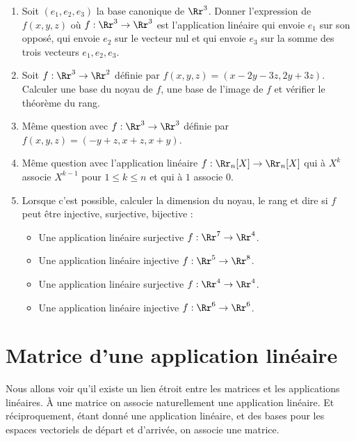 \documentclass[class=report,crop=false]{standalone}
\begin{document}
\begin{miniexercices}
\sauteligne
\begin{enumerate}
  \item Soit $(e_1,e_2,e_3)$ la base canonique de $\Rr^3$. Donner l'expression
  de $f(x,y,z)$ où $f : \Rr^3 \to \Rr^3$
  est l'application linéaire
  qui envoie $e_1$ sur son opposé,
  qui envoie $e_2$ sur le vecteur nul et
  qui envoie $e_3$ sur la somme des trois vecteurs $e_1, e_2, e_3$.

  \item Soit $f : \Rr^3 \to \Rr^2$ définie par $f(x,y,z)=(x-2y-3z,2y+3z)$.
  Calculer une base du noyau de $f$, une base de l'image de $f$ et vérifier le théorème du rang.

  \item Même question avec $f : \Rr^3 \to \Rr^3$ définie par $f(x,y,z)=(-y+z,x+z,x+y)$.

  \item Même question avec l'application linéaire $f : \Rr_n[X] \to \Rr_n[X]$ qui à
  $X^k$ associe $X^{k-1}$ pour $1 \le k \le n$ et qui à $1$ associe $0$.

  \item Lorsque c'est possible, calculer la dimension du noyau, le rang et dire
  si $f$ peut être injective, surjective, bijective :
    \begin{itemize}
      \item Une application linéaire surjective $f : \Rr^7 \to \Rr^4$.
      \item Une application linéaire injective $f : \Rr^5 \to \Rr^8$.
      \item Une application linéaire surjective $f : \Rr^4 \to \Rr^4$.
      \item Une application linéaire injective $f : \Rr^6 \to \Rr^6$.
    \end{itemize}


\end{enumerate}
\end{miniexercices}




\section{Matrice d'une application linéaire}

Nous allons voir qu'il existe un lien étroit entre les matrices et les applications linéaires.
\`A une matrice on associe naturellement une application linéaire. Et
réciproquement, étant donné une application linéaire, et des bases pour les espaces vectoriels de départ
et d'arrivée, on associe une matrice.
\end{document}
